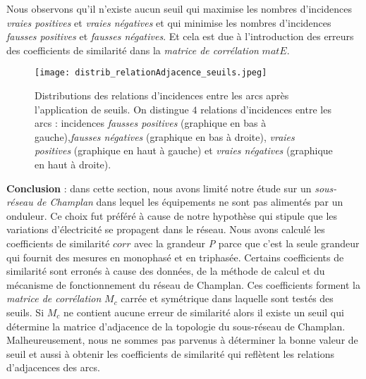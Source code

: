 Nous observons qu'il n'existe aucun seuil qui 
maximise les nombres d'incidences {\em vraies positives}  et {\em vraies n\'egatives}  et qui
minimise les nombres  d'incidences {\em fausses positives} et {\em fausses n\'egatives}.
Et cela est due \`a l'introduction des erreurs des coefficients de similarit\'e dans la {\em matrice de corr\'elation} $matE$.
		\begin{figure}[htb!] 
		\centering
		\texttt{[image: distrib\_relationAdjacence\_seuils.jpeg]}
		\caption{ Distributions des relations d'incidences entre les arcs apr\`es l'application  de seuils. On distingue $4$ relations d'incidences entre les arcs : incidences {\em fausses positives} (graphique en bas \`a gauche),{\em fausses n\'egatives} (graphique en bas \`a droite), {\em vraies positives} (graphique en haut \`a gauche) et {\em vraies n\'egatives} (graphique en haut \`a droite).
		}
		\label{distrib_relationAdjacence_seuils_distancePerson}
		\end{figure}
\newline

{\bf Conclusion} :
dans cette section, nous avons limit\'e notre \'etude sur un {\em sous-r\'eseau de Champlan} dans lequel les \'equipements ne sont pas aliment\'es par un onduleur. Ce choix fut pr\'ef\'er\'e \`a cause de notre hypoth\`ese qui stipule que les variations d'\'electricit\'e se propagent dans le r\'eseau. Nous avons calcul\'e les coefficients de similarit\'e $corr$ avec la grandeur {\em P} parce que c'est la seule grandeur qui fournit des mesures en monophas\'e et en triphas\'ee. Certains coefficients de similarit\'e sont erron\'es \`a cause des donn\'ees, de la m\'ethode de calcul  et du m\'ecanisme de fonctionnement du r\'eseau de Champlan. Ces coefficients forment la {\em matrice de corr\'elation} $M_c$ carr\'ee et sym\'etrique dans laquelle sont test\'es des seuils. 
Si $M_c$ ne contient aucune erreur de similarit\'e alors il existe un seuil qui d\'etermine la matrice d'adjacence de la topologie du sous-r\'eseau de Champlan. Malheureusement, nous ne sommes pas parvenus \`a d\'eterminer la bonne valeur de seuil et aussi \`a obtenir les coefficients de similarit\'e qui refl\`etent les relations d'adjacences des arcs.


